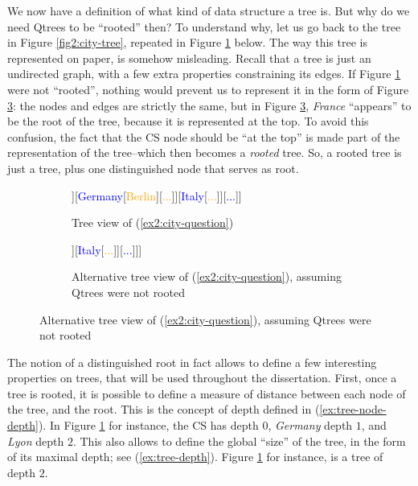 We now have a definition of what kind of data structure a tree is. But why do we need  Qtrees to be ``rooted'' then? To understand why, let us go back to the tree in Figure \ref{fig2:city-tree}, repeated in Figure \ref{fig2:city-tree-repeated} below. The way this tree is represented on paper, is somehow misleading. Recall that a tree is just an undirected graph, with a few extra properties constraining its edges. If Figure \ref{fig2:city-tree-repeated} were not ``rooted'', nothing would prevent us to represent it in the form of Figure \ref{fig2:city-tree-france-root}: the nodes and edges are strictly the same, but in Figure \ref{fig2:city-tree-france-root}, \textit{France} ``appears'' to be the root of the tree, because it is represented at the top. To avoid this confusion, the fact that the CS node should be ``at the top'' is made part of the representation of the tree--which then becomes a \textit{rooted} tree. So, a rooted tree is just a tree, plus one distinguished node that serves as root.

\begin{figure}[H]
	\centering
	\begin{subfigure}[t]{.45\linewidth}
		\centering
		\begin{forest}
			[{CS\\
				Jo grew up in...}[\textcolor{blue}{France}[\textcolor{orange}{{Paris}}][\textcolor{orange}{Lyon}][\textcolor{orange}{...}]][\textcolor{blue}{Germany}[\textcolor{orange}{Berlin}][\textcolor{orange}{...}]][\textcolor{blue}{Italy}[\textcolor{orange}{...}]][\textcolor{blue}{...}]]
		\end{forest}
		\caption{Tree view of (\ref{ex2:city-question})}\label{fig2:city-tree-repeated}
	\end{subfigure}
	\hfill
	\begin{subfigure}[t]{.45\linewidth}
		\centering
		\begin{forest}
			[\textcolor{blue}{France}[\textcolor{orange}{Paris}][\textcolor{orange}{Lyon}][\textcolor{orange}{...}][CS[\textcolor{blue}{Germany}[\textcolor{orange}{Berlin}][\textcolor{orange}{...}]][\textcolor{blue}{Italy}[\textcolor{orange}{...}]][\textcolor{blue}{...}]]]
		\end{forest}
		\caption{Alternative tree view of (\ref{ex2:city-question}), assuming Qtrees were not rooted}\label{fig2:city-tree-france-root}
	\end{subfigure}
\end{figure}


The notion of a distinguished root in fact allows to define a few interesting properties on trees, that will be used throughout the dissertation. First, once a tree is rooted, it is possible to define a measure of distance between each node of the tree, and the root. This is the concept of depth defined in (\ref{ex:tree-node-depth}). In Figure \ref{fig2:city-tree-repeated} for instance, the CS has depth $0$, \textit{Germany} depth $1$, and \textit{Lyon} depth $2$. This also allows to define the global ``size'' of the tree, in the form of its maximal depth; see (\ref{ex:tree-depth}). Figure \ref{fig2:city-tree-repeated} for instance, is a tree of depth $2$.

